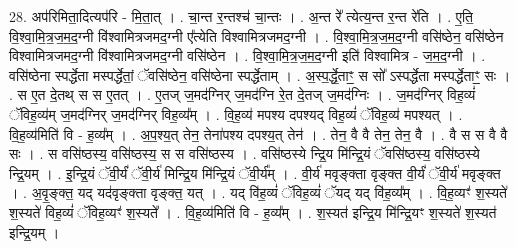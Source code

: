 \documentclass[17pt]{extarticle}
\begin{document}
28. अप॑रिमिता॒दित्यप॑रि - मि॒ता॒त् । . चा॒न्त र॒न्तश्च॑ चा॒न्तः । . अ॒न्त रे᳚ त्येत्य॒न्त र॒न्त रे॑ति । . ए॒ति॒ वि॒श्वा॒मि॒त्र॒ज॒म॒द॒ग्नी वि॑श्वामित्रजमद॒ग्नी ए᳚त्येति विश्वामित्रजमद॒ग्नी । . वि॒श्वा॒मि॒त्र॒ज॒म॒द॒ग्नी वसि॑ष्ठेन॒ वसि॑ष्ठेन विश्वामित्रजमद॒ग्नी वि॑श्वामित्रजमद॒ग्नी वसि॑ष्ठेन । . वि॒श्वा॒मि॒त्र॒ज॒म॒द॒ग्नी इति॑ विश्वामित्र - ज॒म॒द॒ग्नी । . वसि॑ष्ठेना स्पर्द्धेता मस्पर्द्धेतां॒ ॅवसि॑ष्ठेन॒ वसि॑ष्ठेना स्पर्द्धेताम् । . अ॒स्प॒र्द्धे॒ताꣳ॒॒ स सो᳚ ऽस्पर्द्धेता मस्पर्द्धेताꣳ॒॒ सः । . स ए॒त दे॒तथ् स स ए॒तत् । . ए॒तज् ज॒मद॑ग्निर् ज॒मद॑ग्नि रे॒त दे॒तज् ज॒मद॑ग्निः । . ज॒मद॑ग्निर् विह॒व्यं॑ ॅविह॒व्य॑म् ज॒मद॑ग्निर् ज॒मद॑ग्निर् विह॒व्य᳚म् । . वि॒ह॒व्य॑ मपश्य दपश्यद् विह॒व्यं॑ ॅविह॒व्य॑ मपश्यत् । . वि॒ह॒व्य॑मिति॑ वि - ह॒व्य᳚म् । . अ॒प॒श्य॒त् तेन॒ तेना॑पश्य दपश्य॒त् तेन॑ । . तेन॒ वै वै तेन॒ तेन॒ वै । . वै स स वै वै सः । . स वसि॑ष्ठस्य॒ वसि॑ष्ठस्य॒ स स वसि॑ष्ठस्य । . वसि॑ष्ठस्ये न्द्रि॒य मि॑न्द्रि॒यं ॅवसि॑ष्ठस्य॒ वसि॑ष्ठस्ये न्द्रि॒यम् । . इ॒न्द्रि॒यं ॅवी॒र्यं॑ ॅवी॒र्य॑ मिन्द्रि॒य मि॑न्द्रि॒यं ॅवी॒र्य᳚म् । . वी॒र्य॑ मवृङ्क्ता वृङ्क्त वी॒र्यं॑ ॅवी॒र्य॑ मवृङ्क्त । . अ॒वृ॒ङ्क्त॒ यद् यद॑वृङ्क्ता वृङ्क्त॒ यत् । . यद् वि॑ह॒व्यं॑ ॅविह॒व्यं॑ ॅयद् यद् वि॑ह॒व्य᳚म् । . वि॒ह॒व्यꣳ॑ श॒स्यते॑ श॒स्यते॑ विह॒व्यं॑ ॅविह॒व्यꣳ॑ श॒स्यते᳚ । . वि॒ह॒व्य॑मिति॑ वि - ह॒व्य᳚म् । . श॒स्यत॑ इन्द्रि॒य मि॑न्द्रि॒यꣳ श॒स्यते॑ श॒स्यत॑ इन्द्रि॒यम् । \newline
\end{document}

